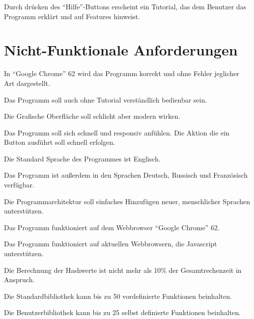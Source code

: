 \documentclass[parskip=full,11pt,twoside]{scrartcl}
\begin{document}
Durch drücken des \enquote {Hilfe}-Buttons erscheint ein Tutorial, das dem Benutzer das Programm erklärt und auf Features hinweist.



\newpage
\section{Nicht-Funktionale Anforderungen}


In \enquote{Google Chrome} 62 wird das Programm korrekt und ohne Fehler jeglicher Art dargestellt.

Das Programm soll auch ohne Tutorial verständlich bedienbar sein.

Die Grafische Oberfläche soll schlicht aber modern wirken.

Das Programm soll sich schnell und responsiv anfühlen. Die Aktion die ein Button ausführt soll schnell erfolgen.

Die Standard Sprache des Programmes ist Englisch.

Das Programm ist außerdem in den Sprachen Deutsch, Russisch und Französisch verfügbar.

Die Programmarchitektur soll einfaches Hinzufügen neuer, menschlicher Sprachen unterstützen.

Das Programm funktioniert auf dem Webbrowser \enquote{Google Chrome} 62.

Das Programm funktioniert auf aktuellen Webbrowsern, die Javascript unterstützen.

Die Berechnung der Hashwerte ist nicht mehr als 10\% der Gesamtrechenzeit in Anspruch.

Die Standardbibliothek kann bis zu 50 vordefinierte Funktionen beinhalten.

Die Benutzerbibliothek kann bis zu 25 selbst definierte Funktionen beinhalten.
\end{document}
